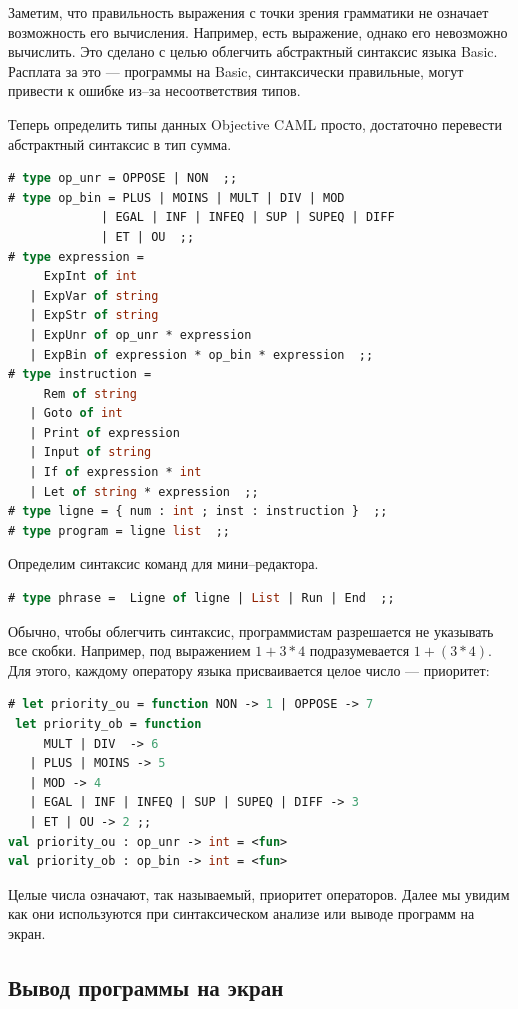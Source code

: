 Заметим, что правильность выражения с точки зрения грамматики не означает 
возможность его вычисления. Например,  есть выражение, 
однако его невозможно вычислить. Это сделано с целью облегчить абстрактный 
синтаксис языка Basic. Расплата за это --- программы на Basic, синтаксически 
правильные, могут привести к ошибке из--за несоответствия типов.

Теперь определить типы данных Objective CAML просто, достаточно перевести 
абстрактный синтаксис в тип сумма.

\begin{lstlisting}[language=OCaml]
# type op_unr = OPPOSE | NON  ;;
# type op_bin = PLUS | MOINS | MULT | DIV | MOD  
             | EGAL | INF | INFEQ | SUP | SUPEQ | DIFF 
             | ET | OU  ;;
# type expression = 
     ExpInt of int 
   | ExpVar of string
   | ExpStr of string 
   | ExpUnr of op_unr * expression
   | ExpBin of expression * op_bin * expression  ;;
# type instruction = 
     Rem of string
   | Goto of int 
   | Print of expression
   | Input of string 
   | If of expression * int 
   | Let of string * expression  ;;
# type ligne = { num : int ; inst : instruction }  ;;
# type program = ligne list  ;;
\end{lstlisting}

Определим синтаксис команд для мини--редактора.

\begin{lstlisting}[language=OCaml]
# type phrase =  Ligne of ligne | List | Run | End  ;;
\end{lstlisting}

Обычно, чтобы облегчить синтаксис, программистам разрешается не указывать все 
скобки. Например, под выражением $1 + 3 * 4$ подразумевается $1 + (3 * 4)$. 
Для этого, каждому оператору языка присваивается целое число --- приоритет:

\begin{lstlisting}[language=OCaml]
# let priority_ou = function NON -> 1 | OPPOSE -> 7
 let priority_ob = function 
     MULT | DIV  -> 6
   | PLUS | MOINS -> 5
   | MOD -> 4
   | EGAL | INF | INFEQ | SUP | SUPEQ | DIFF -> 3
   | ET | OU -> 2 ;;
val priority_ou : op_unr -> int = <fun>
val priority_ob : op_bin -> int = <fun>
\end{lstlisting}

Целые числа означают, так называемый, приоритет операторов. Далее мы увидим как 
они используются при синтаксическом анализе или выводе программ на экран.

\subsection{Вывод программы на экран}
\label{subsec:program_pretty_printing}

